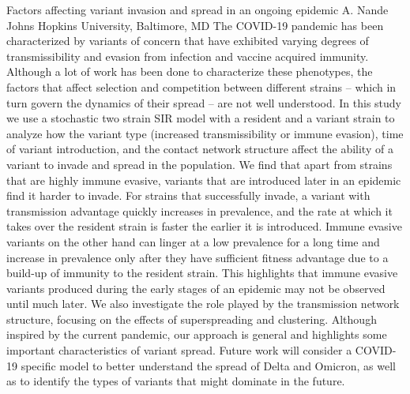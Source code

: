 
    \begin{abstract_online}{Factors affecting variant invasion and spread in an ongoing epidemic}{%
        A. Nande}{%
        }{%
        Johns Hopkins University, Baltimore, MD}
    The COVID-19 pandemic has been characterized by variants of concern that have exhibited varying degrees of transmissibility and evasion from infection and vaccine acquired immunity. Although a lot of work has been done to characterize these phenotypes, the factors that affect selection and competition between different strains ­– which in turn govern the dynamics of their spread ­– are not well understood. In this study we use a stochastic two strain SIR model with a resident and a variant strain to analyze how the variant type (increased transmissibility or immune evasion), time of variant introduction, and the contact network structure affect the ability of a variant to invade and spread in the population. We find that apart from strains that are highly immune evasive, variants that are introduced later in an epidemic find it harder to invade. For strains that successfully invade, a variant with transmission advantage quickly increases in prevalence, and the rate at which it takes over the resident strain is faster the earlier it is introduced. Immune evasive variants on the other hand can linger at a low prevalence for a long time and increase in prevalence only after they have sufficient fitness advantage due to a build-up of immunity to the resident strain. This highlights that immune evasive variants produced during the early stages of an epidemic may not be observed until much later. We also investigate the role played by the transmission network structure, focusing on the effects of superspreading and clustering. Although inspired by the current pandemic, our approach is general and highlights some important characteristics of variant spread. Future work will consider a COVID-19 specific model to better understand the spread of Delta and Omicron, as well as to identify the types of variants that might dominate in the future. 
    
    \end{abstract_online}
    